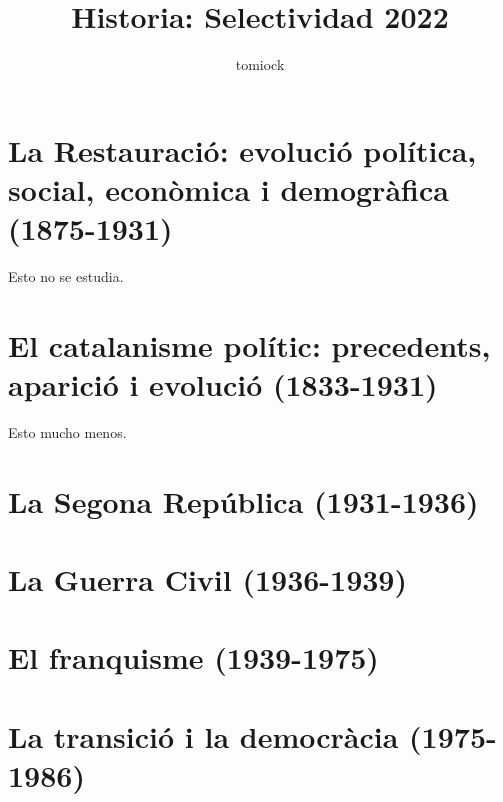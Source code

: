 \documentclass[arial,a4paper,print]{article}
\title{Historia: Selectividad 2022}
\author{tomiock}
\begin{document}
	
\maketitle

\section{La Restauració: evolució política, social, econòmica i demogràfica (1875-1931)}
Esto no se estudia. 

\section{El catalanisme polític: precedents, aparició i evolució (1833-1931)}
Esto mucho menos. 

\section{La Segona República (1931-1936)}


\section{La Guerra Civil (1936-1939)}

\section{El franquisme (1939-1975)}

\section{ La transició i la democràcia (1975-1986)}

	
\end{document}
